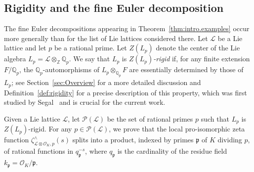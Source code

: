\documentclass[11pt,a4paper]{amsart}
\theoremstyle{plain}
\theoremstyle{remark}
\newcommand{\Z}{\mathbb{Z}}
\newcommand{\Q}{\mathbb{Q}}
\newcommand{\tensor}{\otimes}
\newcommand{\p}{\mathfrak{p}}
\def \p {\ensuremath{\mathfrak{p}}}
\begin{document}
\subsection{Rigidity and the fine Euler decomposition}
The fine Euler decompositions appearing in Theorem~\ref{thm:intro.examples} occur more generally than for the list of Lie lattices considered there.   Let $\mathcal{L}$ be a Lie lattice and let $p$ be a rational prime.  Let $Z(L_p)$ denote the center of the Lie algebra $L_p = \mathcal{L} \tensor_\Z \Q_p$.  We say that $L_p$ is {\emph{$Z(L_p)$-rigid}} if, for any finite extension $F/\Q_p$, the $\Q_p$-automorphisms of $L_p \tensor_{\Q_p} F$ are essentially determined by those of $L_p$; see Section~\ref{sec:Overview} for a more detailed discussion and Definition~\ref{def:rigidity} for a precise description of this property, which was first studied by Segal~\cite{Segal/89} and is crucial for the current work.  

Given a Lie lattice $\mathcal{L}$, 
let $\mathcal{P}(\mathcal{L})$ be the set of rational primes $p$ such that $L_p$ is $Z(L_p)$-rigid.
For any $p \in \mathcal{P}(\mathcal{L})$, we prove that the local pro-isomorphic zeta function $\zeta^\wedge_{\mathcal{L} \tensor \mathcal{O}_K, p}(s)$ splits into a product, indexed by primes $\p $ of $K$ dividing $p$, of rational functions in $q_\p^{-s}$, where $q_\p$ is the cardinality of the residue field $k_\p = \mathcal{O}_K / \p$.    
\end{document}
